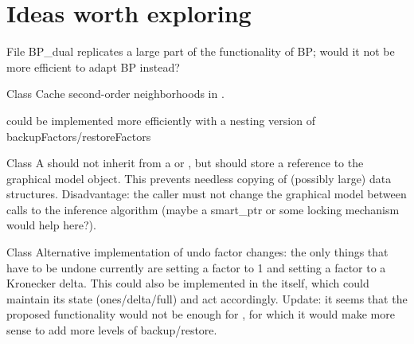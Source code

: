 \chapter{Ideas worth exploring}
\hypertarget{ideas}{}\label{ideas}

\begin{DoxyRefList}
\item[File \doxylink{bp__dual_8h}{bp\+\_\+dual.h} ]\label{ideas__ideas000003}%
%
 BP\+\_\+dual replicates a large part of the functionality of BP; would it not be more efficient to adapt BP instead?  
\item[Class \doxylink{classdai_1_1BipartiteGraph}{dai\+::Bipartite\+Graph} ]\label{ideas__ideas000002}%
%
 Cache second-\/order neighborhoods in .  
\item[Member \doxylink{classdai_1_1CBP_ae5315044de332e92a6ed12acce7f0f75}{dai\+::CBP\+::run\+Recurse} (\doxylink{classdai_1_1InfAlg}{Inf\+Alg} \texorpdfstring{$\ast$}{*}bp, Real orig\+\_\+logZ, std\+::vector$<$ size\+\_\+t $>$ clamped\+\_\+vars\+\_\+list, size\+\_\+t \&num\+\_\+leaves, size\+\_\+t \&choose\+\_\+count, Real \&sum\+\_\+level, Real \&lz\+\_\+out, std\+::vector$<$ Factor $>$ \&beliefs\+\_\+out)]\label{ideas__ideas000001}%
%
  could be implemented more efficiently with a nesting version of backup\+Factors/restore\+Factors  
\item[Class \doxylink{classdai_1_1DAIAlg}{dai\+::DAIAlg\texorpdfstring{$<$}{<} GRM \texorpdfstring{$>$}{>}} ]\label{ideas__ideas000005}%
%
 A  should not inherit from a  or , but should store a reference to the graphical model object. This prevents needless copying of (possibly large) data structures. Disadvantage\+: the caller must not change the graphical model between calls to the inference algorithm (maybe a smart\+\_\+ptr or some locking mechanism would help here?).  
\item[Class \doxylink{classdai_1_1FactorGraph}{dai\+::Factor\+Graph} ]\label{ideas__ideas000010}%
%
 Alternative implementation of undo factor changes\+: the only things that have to be undone currently are setting a factor to 1 and setting a factor to a Kronecker delta. This could also be implemented in the  itself, which could maintain its state (ones/delta/full) and act accordingly. Update\+: it seems that the proposed functionality would not be enough for , for which it would make more sense to add more levels of backup/restore. 

\end{DoxyRefList}
